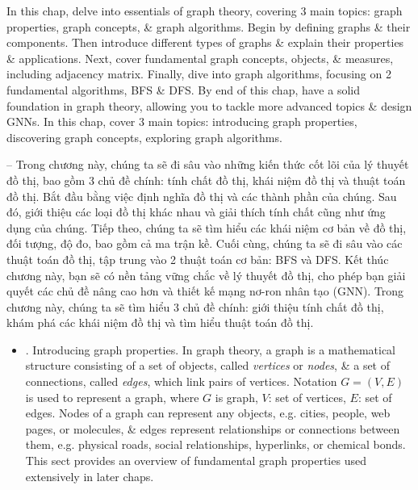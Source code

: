\documentclass{article}
\begin{document}
\begin{itemize}
    In this chap, delve into essentials of graph theory, covering 3 main topics: graph properties, graph concepts, \& graph algorithms. Begin by defining graphs \& their components. Then introduce different types of graphs \& explain their properties \& applications. Next, cover fundamental graph concepts, objects, \& measures, including adjacency matrix. Finally, dive into graph algorithms, focusing on 2 fundamental algorithms, BFS \& DFS. By end of this chap, have a solid foundation in graph theory, allowing you to tackle more advanced topics \& design GNNs. In this chap, cover 3 main topics: introducing graph properties, discovering graph concepts, exploring graph algorithms.

    -- Trong chương này, chúng ta sẽ đi sâu vào những kiến thức cốt lõi của lý thuyết đồ thị, bao gồm 3 chủ đề chính: tính chất đồ thị, khái niệm đồ thị và thuật toán đồ thị. Bắt đầu bằng việc định nghĩa đồ thị và các thành phần của chúng. Sau đó, giới thiệu các loại đồ thị khác nhau và giải thích tính chất cũng như ứng dụng của chúng. Tiếp theo, chúng ta sẽ tìm hiểu các khái niệm cơ bản về đồ thị, đối tượng, độ đo, bao gồm cả ma trận kề. Cuối cùng, chúng ta sẽ đi sâu vào các thuật toán đồ thị, tập trung vào 2 thuật toán cơ bản: BFS và DFS. Kết thúc chương này, bạn sẽ có nền tảng vững chắc về lý thuyết đồ thị, cho phép bạn giải quyết các chủ đề nâng cao hơn và thiết kế mạng nơ-ron nhân tạo (GNN). Trong chương này, chúng ta sẽ tìm hiểu 3 chủ đề chính: giới thiệu tính chất đồ thị, khám phá các khái niệm đồ thị và tìm hiểu thuật toán đồ thị.
    \begin{itemize}
        \item {. Introducing graph properties.} In graph theory, a graph is a mathematical structure consisting of a set of objects, called {\it vertices} or {\it nodes}, \& a set of connections, called {\it edges}, which link pairs of vertices. Notation $G = (V,E)$ is used to represent a graph, where $G$ is graph, $V$: set of vertices, $E$: set of edges. Nodes of a graph can represent any objects, e.g. cities, people, web pages, or molecules, \& edges represent relationships or connections between them, e.g. physical roads, social relationships, hyperlinks, or chemical bonds. This sect provides an overview of fundamental graph properties used extensively in later chaps.


\end{itemize}
\end{itemize}
\end{document}
